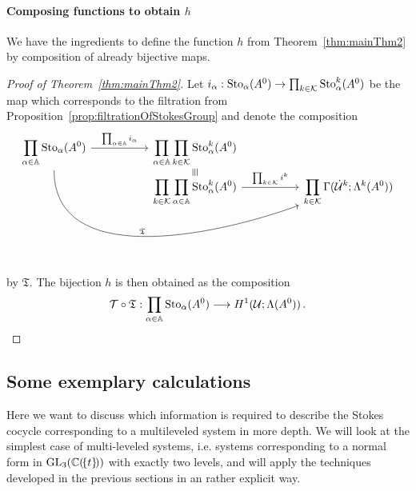 \paragraph{Composing functions to obtain $h$}
We have the ingredients to define the function $h$ from
Theorem~\ref{thm:mainThm2} by composition of already bijective maps.
\begin{proof}[Proof of Theorem~\ref{thm:mainThm2}]
  Let $i_\alpha:\operatorname{Sto}_\alpha(A^0)\to\prod_{k\in\mathcal{K}}\operatorname{Sto}_\alpha^k(A^0)$ be the
  map which corresponds to the filtration from
  Proposition~\ref{prop:filtrationOfStokesGroup} and
  denote the composition
  \[ \begin{tikzcd}[column sep=1.8cm,row sep=-0.2cm]
      \displaystyle \prod_{\alpha\in\A}\Sto_\alpha(A^0)
      \rar{\prod_{\alpha\in\A}i_\alpha}
      \arrow[ddrr, out=270,in=200,"\mathfrak{T}"]
      & \displaystyle \prod_{\alpha\in\A}\prod_{k\in\cK}\Sto_\alpha^k(A^0)
    \\ &\text{\rotatebox[origin=c]{-90}{$\equiv$}}
    \\ &\displaystyle \prod_{k\in\cK}\prod_{\alpha\in\A}\Sto_\alpha^k(A^0)
      \rar{\prod_{k\in\cK}i^k}
      & \displaystyle \prod_{k\in\cK}\Gamma(\dot\cU^k;\Lambda^k(A^0))
  \end{tikzcd} \]
  by $\mathfrak{T}$. The bijection $h$ is then obtained as the composition
  \[
    \mathcal{T}\circ\mathfrak{T}: \prod_{\alpha\in\mathbb{A}}\operatorname{Sto}_\alpha(A^0)
    \longrightarrow H^1(\mathcal{U};\Lambda(A^0)) \,.
  \]
\end{proof}

\subsection{Some exemplary calculations}\label{sec:WhichInformationIsNeeded}
Here we want to discuss which information is required to describe the Stokes
cocycle corresponding to a multileveled system in more depth.
We will look at the simplest case of multi-leveled systems, i.e. systems
corresponding to a normal form in $\operatorname{GL}_3(\mathbb{C}(\!\{t\}\!))$ with exactly two
levels, and will apply the techniques developed in the previous sections in an
rather explicit way.

